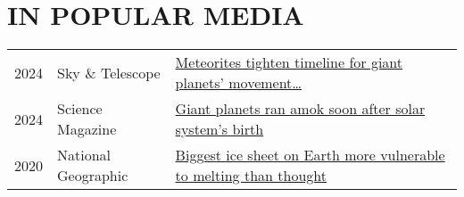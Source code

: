 \section{IN POPULAR MEDIA}
\begin{tabular}{l l l} 
2024 & Sky \& Telescope & \href{https://skyandtelescope.org/astronomy-news/meteorites-tighten-timeline-for-giant-planets-movement-through-the-solar-system/}{Meteorites tighten timeline for giant planets' movement\dots}
\\
2024 & Science Magazine & \href{https://www.science.org/content/article/giant-planets-ran-amok-soon-after-solar-system-s-birth}{Giant planets ran amok soon after solar system's birth}
\\
2020 & National Geographic & \href{https://www.nationalgeographic.com/science/article/east-antarctic-ice-sheet-more-vulnerable-to-melting-than-thought}{Biggest ice sheet on Earth more vulnerable to melting than thought}
\end{tabular}